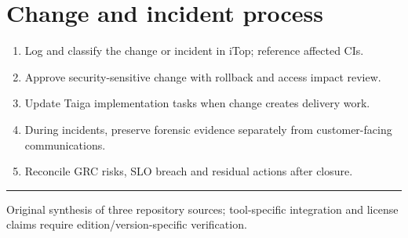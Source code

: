 \documentclass[10pt,letterpaper]{article}
\begin{document}
\section{Change and incident process}
\begin{enumerate}
\item Log and classify the change or incident in iTop; reference affected CIs.
\item Approve security-sensitive change with rollback and access impact review.
\item Update Taiga implementation tasks when change creates delivery work.
\item During incidents, preserve forensic evidence separately from customer-facing communications.
\item Reconcile GRC risks, SLO breach and residual actions after closure.
\end{enumerate}
\vfill\noindent\color{muted}\rule{\linewidth}{0.4pt}\par\scriptsize Original synthesis of three repository sources; tool-specific integration and license claims require edition/version-specific verification.\normalsize
\end{document}
